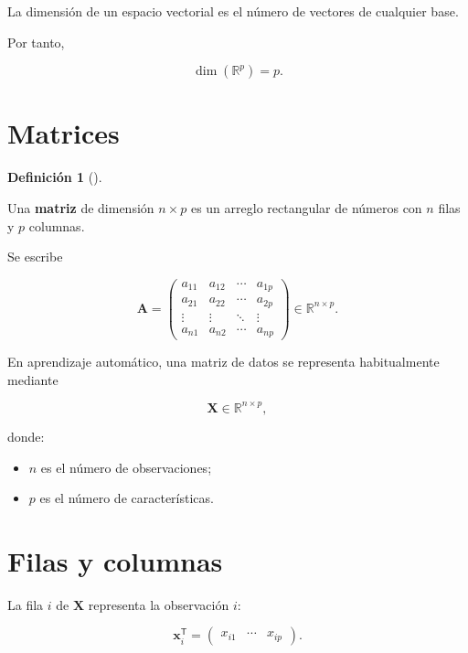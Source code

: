 \documentclass[
  spanish,
  10.5pt,
  letterpaper,
  DIV=11,
  numbers=noendperiod,
  oneside,
  open=any]{scrreprt}
\providecommand{\tightlist}{%
  \setlength{\itemsep}{0pt}\setlength{\parskip}{0pt}}
\theoremstyle{definition}
\newtheorem{definition}{Definición}[chapter]
\theoremstyle{definition}
\theoremstyle{plain}
\theoremstyle{remark}
\begin{document}
La dimensión de un espacio vectorial es el número de vectores de
cualquier base.

Por tanto,

\[
\dim(\mathbb{R}^{p})=p.
\]

\section*{Matrices}\label{matrices}


\begin{definition}[]\protect\hypertarget{def-matriz}{}\label{def-matriz}

Una \textbf{matriz} de dimensión \(n\times p\) es un arreglo rectangular
de números con \(n\) filas y \(p\) columnas.

\end{definition}

Se escribe

\[
\mathbf{A}
=
\begin{pmatrix}
a_{11} & a_{12} & \cdots & a_{1p}\\
a_{21} & a_{22} & \cdots & a_{2p}\\
\vdots & \vdots & \ddots & \vdots\\
a_{n1} & a_{n2} & \cdots & a_{np}
\end{pmatrix}
\in\mathbb{R}^{n\times p}.
\]

En aprendizaje automático, una matriz de datos se representa
habitualmente mediante

\[
\mathbf{X}\in\mathbb{R}^{n\times p},
\]

donde:

\begin{itemize}
\tightlist
\item
  \(n\) es el número de observaciones;
\item
  \(p\) es el número de características.
\end{itemize}

\section*{Filas y columnas}\label{filas-y-columnas}


La fila \(i\) de \(\mathbf{X}\) representa la observación \(i\):

\[
\mathbf{x}_i^{\mathsf T}
=
\begin{pmatrix}
x_{i1} & \cdots & x_{ip}
\end{pmatrix}.
\]
\end{document}
